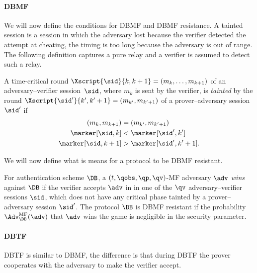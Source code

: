 \paragraph*{\Acl*{DBMF}}

We will now define the conditions for \ac{DBMF} and \ac{DBMF} resistance.
A tainted session is a session in which the adversary lost because the verifier 
detected the attempt at cheating, \eg the timing is too long because the 
adversary is out of range.
The following definition captures a pure relay and a verifier is assumed to 
detect such a relay.

\begin{definition}%
  \label{TaintedMF}
  A time-critical round
  \(\Xscript{\sid}{k, k+1} = (m_k, \dotsc, m_{k+1})\)
  of an adversary--verifier session~\(\sid\), where \(m_k\) is sent by the 
  verifier, is \emph{tainted} by the round
  \(\Xscript{\sid'}{k', k'+1} = (m_{k'}, m_{k'+1})\)
  of a prover--adversary session~\(\sid'\) if
  \begin{align*}
    (m_k, m_{k+1}) &= (m_{k'}, m_{k'+1}) \\
    \marker[\sid, k] &< \marker[\sid', k'] \\
    \marker[\sid, k+1] &> \marker[\sid', k'+1].
  \end{align*}
\end{definition}

We will now define what is means for a protocol to be \ac{DBMF} resistant.

\begin{definition}%
  \label{MFresistance}
  For  authentication scheme \(\DB\), a \((t, \qobs, \qp, \qv)\)-MF 
  adversary \(\adv\) \emph{wins} against \(\DB\) if the verifier accepts 
  \(\adv\) in in one of the \(\qv\) adversary--verifier sessions \(\sid\), 
  which does not have any critical phase tainted by a prover--adversary session 
  \(\sid'\).
  The protocol \(\DB\) is \Ac{DBMF} resistant if the probability 
  \(\Adv_{\DB}^{\text{MF}}(\adv)\) that \(\adv\) wins the game is negligible in 
  the security parameter.
\end{definition}

\paragraph*{\Acl*{DBTF}}

\Acl{DBTF} is similar to \ac{DBMF}, the difference is that during \ac{DBTF} the 
prover cooperates with the adversary to make the verifier accept.

